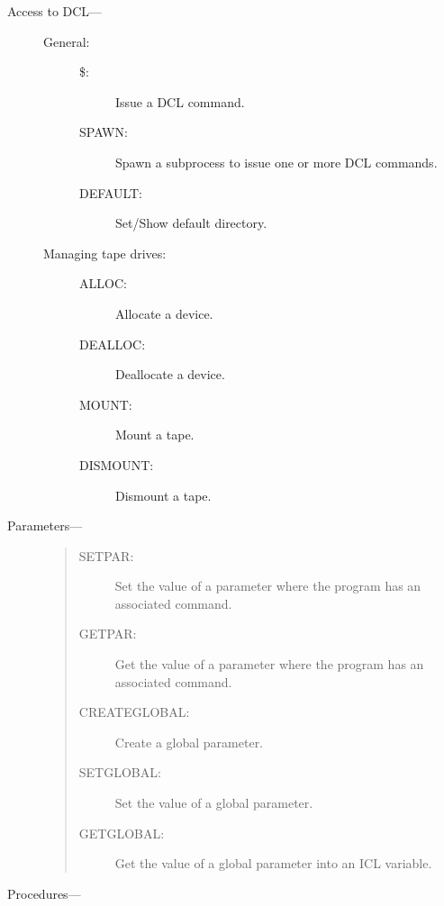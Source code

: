\begin{description}
\item [Access to DCL--- ]

\begin{description}
\item [General:] \mbox{}
\begin{description}
\item[\$:]
 Issue a DCL command.
\item[SPAWN:]
 Spawn a subprocess to issue one or more DCL commands.
\item[DEFAULT:]
 Set/Show default directory.
\end{description}
\item [Managing tape drives:] \mbox{}
\begin{description}
\item[ALLOC:]
 Allocate a device.
\item[DEALLOC:]
 Deallocate a device.
\item[MOUNT:]
 Mount a tape.
\item[DISMOUNT:]
 Dismount a tape.
\end{description}
\end{description}

\item [Parameters--- ]

\begin{quote}
\begin{description}
\item[SETPAR:]
 Set the value of a parameter where the program has an associated command.
\item[GETPAR:]
 Get the value of a parameter where the program has an associated command.
\item[CREATEGLOBAL:]
 Create a global parameter.
\item[SETGLOBAL:]
 Set the value of a global parameter.
\item[GETGLOBAL:]
 Get the value of a global parameter into an ICL variable.
\end{description}
\end{quote}

\item [Procedures--- ]


\end{description}

